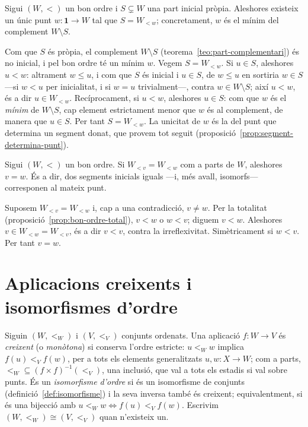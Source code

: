 \begin{proposicio}\label{prop:parts-inicials}
Sigui \((W,<)\) un bon ordre i \(S\subsetneq W\) una part inicial pròpia.
Aleshores existeix un únic punt \(w\colon\mathbf1\to W\) tal que
\(S=W_{<w}\); concretament, \(w\) és el mínim del complement
\(W\setminus S\).
\end{proposicio}

\begin{prova}
Com que \(S\) és pròpia, el complement \(W\setminus S\)
(teorema~\ref{teo:part-complementari}) és no inicial, i pel bon ordre té un
mínim \(w\). Vegem \(S=W_{<w}\). Si \(u\in S\), aleshores \(u<w\): altrament
\(w\le u\), i com que \(S\) és inicial i \(u\in S\), de \(w\le u\) en sortiria
\(w\in S\) ---si \(w<u\) per inicialitat, i si \(w=u\) trivialment---, contra
\(w\in W\setminus S\); així \(u<w\), és a dir \(u\in W_{<w}\).
Recíprocament, si \(u<w\), aleshores \(u\in S\): com que \(w\) és el
\emph{mínim} de \(W\setminus S\), cap element estrictament menor que \(w\)
és al complement, de manera que \(u\in S\). Per tant \(S=W_{<w}\). La
unicitat de \(w\) és la del punt que determina un segment donat, que provem
tot seguit (proposició~\ref{prop:segment-determina-punt}).
\end{prova}

\begin{proposicio}\label{prop:segment-determina-punt}
Sigui \((W,<)\) un bon ordre. Si \(W_{<v}=W_{<w}\) com a parts de \(W\),
aleshores \(v=w\). És a dir, dos segments inicials iguals ---i, més avall,
isomorfs--- corresponen al mateix punt.
\end{proposicio}

\begin{prova}
Suposem \(W_{<v}=W_{<w}\) i, cap a una contradicció, \(v\neq w\). Per la
totalitat (proposició~\ref{prop:bon-ordre-total}), \(v<w\) o \(w<v\); diguem
\(v<w\). Aleshores \(v\in W_{<w}=W_{<v}\), és a dir \(v<v\), contra la
irreflexivitat. Simètricament si \(w<v\). Per tant \(v=w\).
\end{prova}

\section{Aplicacions creixents i isomorfismes d'ordre}\label{sec:creixents}

\begin{definicio}\label{def:creixent}
Siguin \((W,<_W)\) i \((V,<_V)\) conjunts ordenats. Una aplicació
\(f\colon W\to V\) és \emph{creixent} (o \emph{monòtona}) si conserva
l'ordre estricte: \(u<_W w\) implica \(f(u)<_V f(w)\), per a tots els
elements generalitzats \(u,w\colon X\to W\); com a parts,
\({<_W}\subseteq(f\times f)^{-1}({<_V})\), una inclusió, que val a tots
els estadis si val sobre punts. És un \emph{isomorfisme
d'ordre} si és un isomorfisme de conjunts (definició~\ref{def:isomorfisme})
i la seva inversa també és creixent; equivalentment, si és una bijecció amb
\(u<_W w\Leftrightarrow f(u)<_V f(w)\). Escrivim \((W,<_W)\cong(V,<_V)\) quan
n'existeix un.
\end{definicio}

